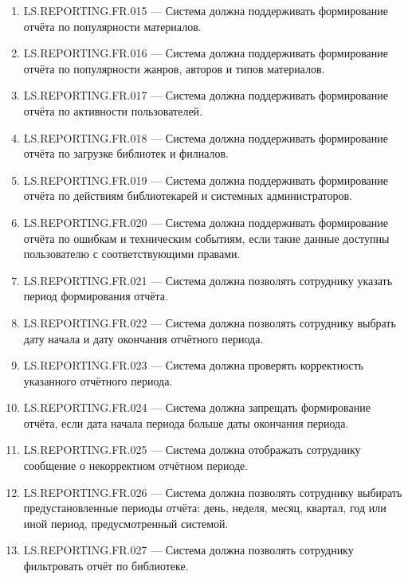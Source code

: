 \documentclass[12pt,a4paper]{article}
\begin{document}
\begin{enumerate}
		\item LS.REPORTING.FR.015 --- Система должна поддерживать формирование отчёта
		по популярности материалов.
		
		\item LS.REPORTING.FR.016 --- Система должна поддерживать формирование отчёта
		по популярности жанров, авторов и типов материалов.
		
		\item LS.REPORTING.FR.017 --- Система должна поддерживать формирование отчёта
		по активности пользователей.
		
		\item LS.REPORTING.FR.018 --- Система должна поддерживать формирование отчёта
		по загрузке библиотек и филиалов.
		
		\item LS.REPORTING.FR.019 --- Система должна поддерживать формирование отчёта
		по действиям библиотекарей и системных администраторов.
		
		\item LS.REPORTING.FR.020 --- Система должна поддерживать формирование отчёта
		по ошибкам и техническим событиям, если такие данные доступны пользователю
		с соответствующими правами.
		
		\item LS.REPORTING.FR.021 --- Система должна позволять сотруднику указать период
		формирования отчёта.
		
		\item LS.REPORTING.FR.022 --- Система должна позволять сотруднику выбрать дату
		начала и дату окончания отчётного периода.
		
		\item LS.REPORTING.FR.023 --- Система должна проверять корректность указанного
		отчётного периода.
		
		\item LS.REPORTING.FR.024 --- Система должна запрещать формирование отчёта, если
		дата начала периода больше даты окончания периода.
		
		\item LS.REPORTING.FR.025 --- Система должна отображать сотруднику сообщение
		о некорректном отчётном периоде.
		
		\item LS.REPORTING.FR.026 --- Система должна позволять сотруднику выбирать
		предустановленные периоды отчёта: день, неделя, месяц, квартал, год или иной
		период, предусмотренный системой.
		
		\item LS.REPORTING.FR.027 --- Система должна позволять сотруднику фильтровать
		отчёт по библиотеке.
		

\end{enumerate}
\end{document}
